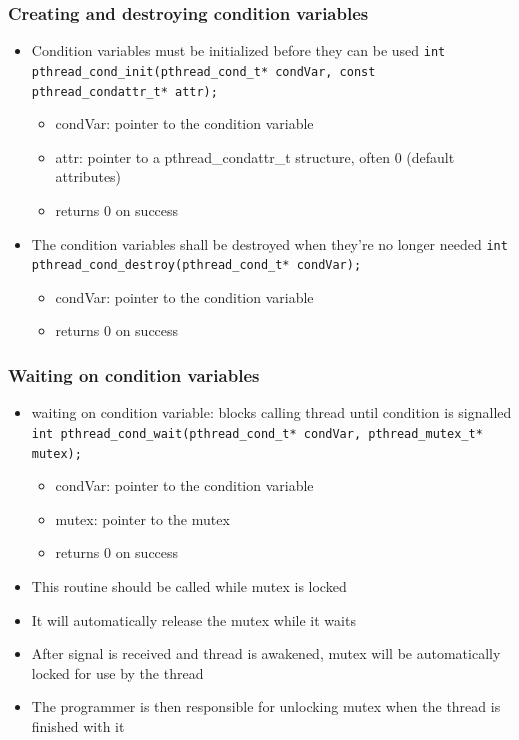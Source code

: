 \subsubsection{Creating and destroying condition variables}
\begin{itemize}
  \item Condition variables must be initialized before they can be used\newline
  \lstinline{int pthread_cond_init(pthread_cond_t* condVar, const pthread_condattr_t* attr);}
  \begin{itemize}
    \item condVar: pointer to the condition variable
    \item attr: pointer to a pthread\_condattr\_t structure, often 0 (default attributes)
    \item returns 0 on success
  \end{itemize}
  \item The condition variables shall be destroyed when they're no longer needed\newline
  \lstinline{int pthread_cond_destroy(pthread_cond_t* condVar);}
  \begin{itemize}
    \item condVar: pointer to the condition variable
    \item returns 0 on success
  \end{itemize}
\end{itemize}

\subsubsection{Waiting on condition variables}
\begin{itemize}
  \item waiting on condition variable: blocks calling thread until condition is signalled\newline
  \lstinline{int pthread_cond_wait(pthread_cond_t* condVar, pthread_mutex_t* mutex);}
  \begin{itemize}
    \item condVar: pointer to the condition variable
    \item mutex: pointer to the mutex
    \item returns 0 on success
  \end{itemize}
  \item This routine should be called while mutex is locked
  \item It will automatically release the mutex while it waits
  \item After signal is received and thread is awakened, mutex will be automatically locked for use by the thread
  \item The programmer is then responsible for unlocking mutex when the thread is finished with it
\end{itemize}

